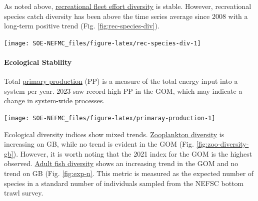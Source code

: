 \documentclass[
  10pt,
]{article}
\let\origfigure\figure
\let\endorigfigure\endfigure
\renewenvironment{figure}[1][2] {
    \expandafter\origfigure\expandafter[H]
} {
    \endorigfigure
}
\begin{document}
As noted above, \href{https://noaa-edab.github.io/catalog/recreational-fishing-indicators.html}{recreational fleet effort diversity} is stable. However, recreational species catch diversity has been above the time series average since 2008 with a long-term positive trend (Fig. \ref{fig:rec-species-div}).

\begin{figure}

{\centering \texttt{[image: SOE-NEFMC\_files/figure-latex/rec-species-div-1]} 

}

\caption{Diversity of recreational catch in New England.}\label{fig:rec-species-div}
\end{figure}

\hypertarget{ecological-stability}{%
\paragraph{Ecological Stability}\label{ecological-stability}}

Total \href{https://noaa-edab.github.io/catalog/phytoplankton-chlorophyll-size-class-and-primary-production.html}{primary production} (PP) is a measure of the total energy input into a system per year. 2023 saw record high PP in the GOM, which may indicate a change in system-wide processes.

\begin{figure}

{\centering \texttt{[image: SOE-NEFMC\_files/figure-latex/primaray-production-1]} 

}

\caption{Total areal annual primary production by ecological production unit. The dashed line represents the long-term (1998-2023) annual mean.}\label{fig:primaray-production}
\end{figure}

Ecological diversity indices show mixed trends. \href{https://noaa-edab.github.io/catalog/zooplankton-diversity.html}{Zooplankton diversity} is increasing on GB, while no trend is evident in the GOM (Fig. \ref{fig:zoo-diversity-gb}). However, it is worth noting that the 2021 index for the GOM is the highest observed. \href{https://noaa-edab.github.io/catalog/expected-number-of-species.html}{Adult fish diversity} shows an increasing trend in the GOM and no trend on GB (Fig. \ref{fig:exp-n}. This metric is measured as the expected number of species in a standard number of individuals sampled from the NEFSC bottom trawl survey.
\end{document}
